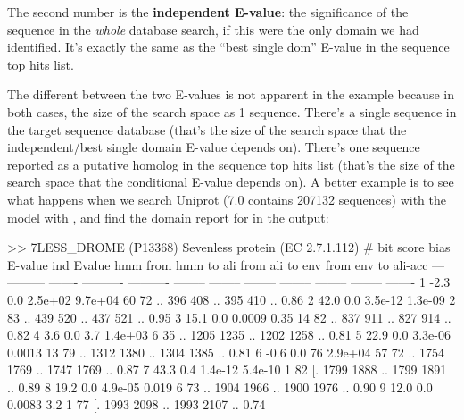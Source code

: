 The second number is the \textbf{independent E-value}: the
significance of the sequence in the \emph{whole} database search, if
this were the only domain we had identified. It's exactly the same as
the ``best single dom'' E-value in the sequence top hits list. 

The different between the two E-values is not apparent in the
 example because in both cases, the size of the
search space as 1 sequence. There's a single sequence in the target
sequence database (that's the size of the search space that the
independent/best single domain E-value depends on). There's one
sequence reported as a putative homolog in the sequence top hits list
(that's the size of the search space that the conditional E-value
depends on). A better example is to see what happens when we search
Uniprot (7.0 contains 207132 sequences) with the  model with
, and find the domain
report for  in the output:

\begin{sreoutput}
>> 7LESS_DROME  (P13368) Sevenless protein (EC 2.7.1.112)
     # bit score    bias    E-value ind Evalue hmm from   hmm to    ali from   ali to    env from   env to    ali-acc
   --- --------- ------- ---------- ---------- -------- --------    -------- --------    -------- --------    -------
     1      -2.3     0.0    2.5e+02    9.7e+04       60       72 ..      396      408 ..      395      410 ..    0.86
     2      42.0     0.0    3.5e-12    1.3e-09        2       83 ..      439      520 ..      437      521 ..    0.95
     3      15.1     0.0     0.0009       0.35       14       82 ..      837      911 ..      827      914 ..    0.82
     4       3.6     0.0        3.7    1.4e+03        6       35 ..     1205     1235 ..     1202     1258 ..    0.81
     5      22.9     0.0    3.3e-06     0.0013       13       79 ..     1312     1380 ..     1304     1385 ..    0.81
     6      -0.6     0.0         76    2.9e+04       57       72 ..     1754     1769 ..     1747     1769 ..    0.87
     7      43.3     0.4    1.4e-12    5.4e-10        1       82 [.     1799     1888 ..     1799     1891 ..    0.89
     8      19.2     0.0    4.9e-05      0.019        6       73 ..     1904     1966 ..     1900     1976 ..    0.90
     9      12.0     0.0     0.0083        3.2        1       77 [.     1993     2098 ..     1993     2107 ..    0.74
\end{sreoutput}

